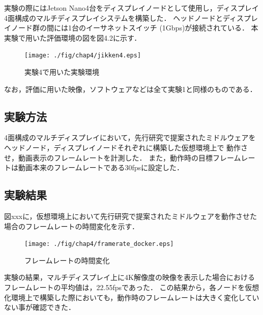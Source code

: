 実験の際にはJetson Nano4台をディスプレイノードとして使用し，ディスプレイ4面構成のマルチディスプレイシステムを構築した．
ヘッドノードとディスプレイノード群の間には1台のイーサネットスイッチ (1Gbps)が接続されている．
本実験で用いた評価環境の図を図4.2に示す．

\begin{figure}[H]
    \hspace*{\fill}
    \texttt{[image: ./fig/chap4/jikken4.eps]}
    \hspace*{\fill}
    \caption{実験4で用いた実験環境}
\end{figure}

なお，評価に用いた映像，ソフトウェアなどは全て実験1と同様のものである．

\subsection*{実験方法}
4面構成のマルチディスプレイにおいて，先行研究で提案されたミドルウェアをヘッドノード，ディスプレイノードそれぞれに構築した仮想環境上で
動作させ，動画表示のフレームレートを計測した．
また，動作時の目標フレームレートは動画本来のフレームレートである30fpsに設定した．

\subsection*{実験結果}
図xxxに，仮想環境上において先行研究で提案されたミドルウェアを動作させた場合のフレームレートの時間変化を示す．

\begin{figure}[H]
    \hspace*{\fill}
    \texttt{[image: ./fig/chap4/framerate\_docker.eps]}
    \hspace*{\fill}
    \caption{フレームレートの時間変化}
\end{figure}

実験の結果，マルチディスプレイ上に4K解像度の映像を表示した場合におけるフレームレートの平均値は，22.55fpsであった．
この結果から，各ノードを仮想化環境上で構築した際においても，動作時のフレームレートは大きく変化していない事が確認できた．